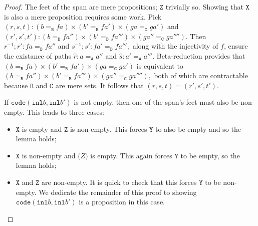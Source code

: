 \message{ !name(notes.tex)}\documentclass[12pt]{amsart}
\newcommand{\inv}{^{-1}}
\newcommand{\type}[1]{\mathtt{#1}}
\newcommand{\tin}{\colon}
\newcommand{\A}{\type{A}}
\newcommand{\B}{\type{B}}
\newcommand{\C}{\type{C}}
\newcommand{\inl}{\type{inl}}
\newcommand{\code}{\type{code}}
\theoremstyle{remark}
\theoremstyle{definition}
\begin{document}
\begin{proof}
%  
  The feet of the span are mere propositions; \( \type{Z} \) trivially
  so. Showing that \( \type{X} \) is also a mere proposition requires
  some work. Pick
  \(
      ( r,s,t ) \tin
      ( b =_\B fa ) \times ( b' =_\B fa') \times ( ga =_\C ga' )
  \)
  and
  \(
      ( r',s',t' ) \tin
      ( b =_\B fa'' ) \times ( b' =_\B fa''') \times ( ga'' =_\C ga'''').
  \)
  Then
  \(
      r\inv ; r' \tin fa =_\B fa''
  \)
  and
  \(
      s\inv ; s' \tin fa' =_\B fa''',
  \)
  along with the injectivity of \( f \), ensure the existance of paths
  \(
      \hat{r} \tin a =_\A a''
  \)
  and
  \(
      \hat{s} \tin a' =_\A a'''.
  \)
  Beta-reduction provides that
  \(
      ( b =_\B fa ) \times ( b' =_\B fa') \times ( ga =_\C ga' )
  \)
  is equivalent to
  \(
     ( b =_\B fa'' ) \times ( b' =_\B fa''') \times ( ga'' =_\C ga'''' ),
  \)
  both of which are contractable because \( \B \) and \( \C \)
  are mere sets.  It follows that
  \(
      ( r,s,t ) = ( r',s',t' ).
  \)
  \par

  If
  \(
      \code ( \inl b , \inl b' )
  \)
  is not empty, then one of the span's feet must also be
  non-empty.  This leads to three cases:
  \begin{itemize}
  \item
    \( \type{X} \) is empty and \( \type{Z} \) is non-empty. This
    forces \( \type{Y} \) to also be empty and so the lemma holds;
  \item
    \( \type{X} \) is non-empty and \( \type(Z) \) is empty. This
    again forces \( \type{Y} \) to be empty, so the lemma holds;
  \item
    \( \type{X} \) and \( \type{Z} \) are non-empty. It is quick to check
    that this forces \( \type{Y} \) to be non-empty. We dedicate the
    remainder of this proof to showing \( \code ( \inl b , \inl b' )
    \) is a proposition in this case.
  \end{itemize}
  

\end{proof}
\end{document}
